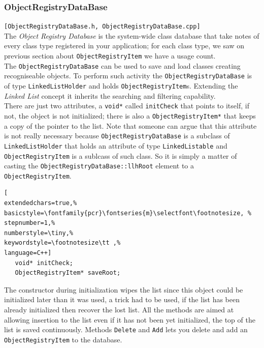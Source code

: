 \subsubsection{ObjectRegistryDataBase}
\texttt{[ObjectRegistryDataBase.h, ObjectRegistryDataBase.cpp]}\\
The \textit{Object Registry Database} is the system-wide class database that take notes of every class type registered in your application; for each class type, we saw on previous section about \texttt{ObjectRegistryItem} we have a usage count.\\


The \texttt{ObjectRegistryDataBase} can be used to save and load classes creating recogniseable objects. To perform such activity the \texttt{ObjectRegistryDataBase} is of type \texttt{LinkedListHolder} and holds \texttt{ObjectRegistryItem}s. Extending the \textit{Linked List} concept it inherits the searching and filtering capability.\\


There are just two attributes, a \texttt{void*} called \texttt{initCheck} that points to itself, if not, the object is not initialized; there is also a \texttt{ObjectRegistryItem*} that keeps a copy of the pointer to the list. Note that someone can argue that this attribute is not really necessary because \texttt{ObjectRegistryDataBase} is a subclass of \texttt{LinkedListHolder} that holds an attribute of type \texttt{LinkedListable} and \texttt{ObjectRegistryItem} is a sublcass of such class. So it is simply a matter of casting the \texttt{ObjectRegistryDataBase::llhRoot} element to a \texttt{ObjectRegistryItem}.

\begin{lstlisting}[
extendedchars=true,%
basicstyle=\fontfamily{pcr}\fontseries{m}\selectfont\footnotesize, %
stepnumber=1,%
numberstyle=\tiny,%
keywordstyle=\footnotesize\tt ,%
language=C++]
   void* initCheck;
   ObjectRegistryItem* saveRoot;
\end{lstlisting}

The constructor during initialization wipes the list since this object could be initialized later than it was used, a trick had to be used, if the list has been already initialized then recover the lost list. All the methods are aimed at allowing insertion to the list even if it has not been yet initialized, the top of the list is saved continuously. Methods \texttt{Delete} and \texttt{Add} lets you delete and add an \texttt{ObjectRegistryItem} to the database.

